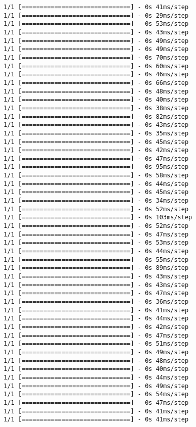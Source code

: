\documentclass[11pt]{article}
\begin{document}
\begin{Verbatim}[commandchars=\\\{\}]
1/1 [==============================] - 0s 41ms/step
1/1 [==============================] - 0s 29ms/step
1/1 [==============================] - 0s 53ms/step
1/1 [==============================] - 0s 43ms/step
1/1 [==============================] - 0s 49ms/step
1/1 [==============================] - 0s 49ms/step
1/1 [==============================] - 0s 70ms/step
1/1 [==============================] - 0s 60ms/step
1/1 [==============================] - 0s 46ms/step
1/1 [==============================] - 0s 66ms/step
1/1 [==============================] - 0s 48ms/step
1/1 [==============================] - 0s 40ms/step
1/1 [==============================] - 0s 38ms/step
1/1 [==============================] - 0s 82ms/step
1/1 [==============================] - 0s 43ms/step
1/1 [==============================] - 0s 35ms/step
1/1 [==============================] - 0s 45ms/step
1/1 [==============================] - 0s 42ms/step
1/1 [==============================] - 0s 47ms/step
1/1 [==============================] - 0s 95ms/step
1/1 [==============================] - 0s 58ms/step
1/1 [==============================] - 0s 44ms/step
1/1 [==============================] - 0s 45ms/step
1/1 [==============================] - 0s 34ms/step
1/1 [==============================] - 0s 52ms/step
1/1 [==============================] - 0s 103ms/step
1/1 [==============================] - 0s 52ms/step
1/1 [==============================] - 0s 47ms/step
1/1 [==============================] - 0s 53ms/step
1/1 [==============================] - 0s 44ms/step
1/1 [==============================] - 0s 55ms/step
1/1 [==============================] - 0s 89ms/step
1/1 [==============================] - 0s 43ms/step
1/1 [==============================] - 0s 43ms/step
1/1 [==============================] - 0s 47ms/step
1/1 [==============================] - 0s 36ms/step
1/1 [==============================] - 0s 41ms/step
1/1 [==============================] - 0s 44ms/step
1/1 [==============================] - 0s 42ms/step
1/1 [==============================] - 0s 47ms/step
1/1 [==============================] - 0s 51ms/step
1/1 [==============================] - 0s 49ms/step
1/1 [==============================] - 0s 48ms/step
1/1 [==============================] - 0s 40ms/step
1/1 [==============================] - 0s 44ms/step
1/1 [==============================] - 0s 49ms/step
1/1 [==============================] - 0s 54ms/step
1/1 [==============================] - 0s 47ms/step
1/1 [==============================] - 0s 41ms/step
1/1 [==============================] - 0s 41ms/step

\end{Verbatim}
\end{document}
